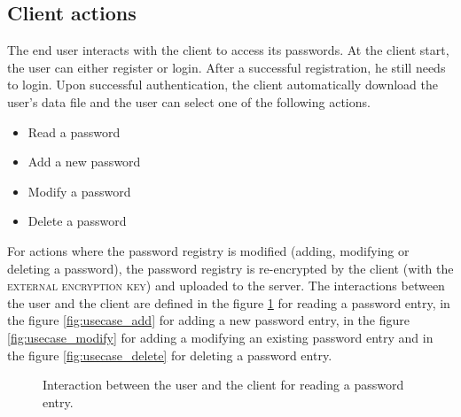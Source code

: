 \documentclass[../report.tex]{subfiles}
\begin{document}
\subsection{Client actions}
The end user interacts with the client to access its passwords.
At the client start, the user can either register or login.
After a successful registration, he still needs to login.
Upon successful authentication, the client automatically download the user's data file and the user can select one of the following actions.
\begin{itemize}
 \item Read a password
 \item Add a new password
 \item Modify a password
 \item Delete a password
\end{itemize}

For actions where the password registry is modified (adding, modifying or deleting a password), the password registry is re-encrypted by the client (with the \textsc{external encryption key}) and uploaded to the server.
The interactions between the user and the client are defined in the figure \ref{fig:usecase_read} for reading a password entry, in the figure \ref{fig:usecase_add} for adding a new password entry, in the figure \ref{fig:usecase_modify} for adding a modifying an existing password entry and in the figure \ref{fig:usecase_delete} for deleting a password entry.


\begin{figure}[h]
 \centering
 \setlength{\fboxsep}{10pt}
 \setlength{\fboxrule}{1pt}
 \caption{Interaction between the user and the client for reading a password entry.}
 \label{fig:usecase_read}
\end{figure}
\end{document}
